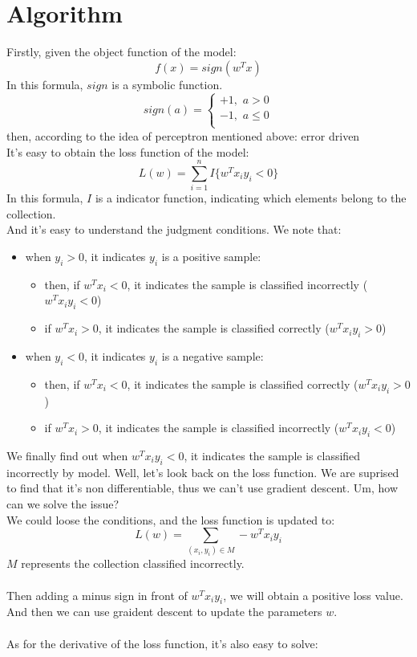 \documentclass{report}
\begin{document}
\section{Algorithm}
Firstly, given the object function of the model:
$$
f(x)=sign(w^Tx)
$$
In this formula, $sign$ is a symbolic function.
$$
sign(a)=
\begin{cases}
+1,\,\,a>0\\
-1,\,\,a\le0\\
\end{cases}
$$
then, according to the idea of perceptron mentioned above: error driven\\
It's easy to obtain the loss function of the model:
$$
L(w)=\sum_{i=1}^n I\{w^Tx_iy_i<0 \}
$$
In this formula, $I$ is a indicator function, indicating which elements belong to the collection.\\
And it's easy to understand the judgment conditions. We note that:
\begin{itemize}
	\item when $y_i>0$, it indicates $y_i$ is a positive sample:
	\begin{itemize}
	\item then, if $w^Tx_i<0$, it indicates the sample is classified incorrectly ($w^Tx_i y_i<0$)
	\item if $w^Tx_i>0$, it indicates the sample is classified correctly ($w^Tx_i y_i>0$)
	\end{itemize} 
	\item when $y_i<0$, it indicates $y_i$ is a negative sample:
	\begin{itemize}
	\item then, if $w^Tx_i<0$, it indicates the sample is classified correctly ($w^Tx_i y_i>0$)
	\item if $w^Tx_i>0$, it indicates the sample is classified incorrectly ($w^Tx_i y_i<0$)
	\end{itemize}
\end{itemize}
We finally find out when $w^Tx_i y_i<0$, it indicates the sample is classified incorrectly by model.
Well, let's look back on the loss function. We are suprised to find that it's non differentiable, thus we can't use gradient descent. Um, how can we solve the issue?\\
We could loose the conditions, and the loss function is updated to:
$$
L(w)=\sum_{(x_i,y_i)\in M} -w^Tx_i y_i
$$
$M$ represents the collection classified incorrectly.\\\\
Then adding a minus sign in front of $w^Tx_i y_i$, we will obtain a positive loss value. And then we can use graident descent to update the parameters $w$.\\\\
As for the derivative of the loss function, it's also easy to solve:
\end{document}
